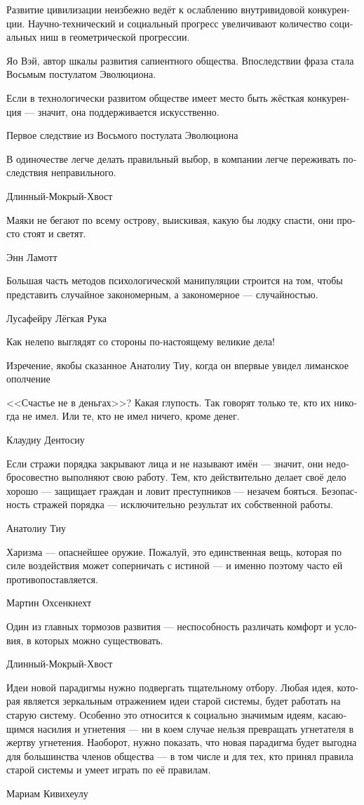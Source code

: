 \documentclass[a4paper,12pt,fleqn]{book}\usepackage{polyglossia}\setdefaultlanguage[babelshorthands=true]{russian}\setotherlanguage{english}\defaultfontfeatures{Ligatures=TeX,Mapping=tex-text}\usepackage{xcolor}\newcommand{\ml}[3]{#2}
\begin{document}
{\epigraph
{Развитие цивилизации неизбежно ведёт к ослаблению внутривидовой конкуренции.
Научно-технический и социальный прогресс увеличивают количество социальных ниш в геометрической прогрессии.}
{Яо Вэй, автор шкалы развития сапиентного общества.
Впоследствии фраза стала Восьмым постулатом Эволюциона.}

\epigraph{Если в технологически развитом обществе имеет место быть жёсткая конкуренция --- значит, она поддерживается искусственно.}
{Первое следствие из Восьмого постулата Эволюциона}

\epigraph
{В одиночестве легче делать правильный выбор, в компании легче переживать последствия неправильного.}
{Длинный-Мокрый-Хвост}

\epigraph
{Маяки не бегают по всему острову, выискивая, какую бы лодку спасти, они просто стоят и светят.}
{Энн Ламотт}

\epigraph{
\ml{$0$}
{Большая часть методов психологической манипуляции строится на том, чтобы представить случайное закономерным, а закономерное --- случайностью.}
{Most of methods of psychological manipulation are based on the idea to make random look logical, and or make logical look random.}
}{Лусафейру Лёгкая Рука}

\epigraph
{Как нелепо выглядят со стороны по-настоящему великие дела!}
{Изречение, якобы сказанное Анатолиу Тиу, когда он впервые увидел лиманское ополчение}

\epigraph
{<<Счастье не в деньгах>>?
Какая глупость.
Так говорят только те, кто их никогда не имел.
Или те, кто не имел ничего, кроме денег.}
{Клаудиу Дентосиу}

\epigraph
{Если стражи порядка закрывают лица и не называют имён --- значит, они недобросовестно выполняют свою работу.
Тем, кто действительно делает своё дело хорошо --- защищает граждан и ловит преступников --- незачем бояться.
Безопасность стражей порядка --- исключительно результат их собственной работы.}
{Анатолиу Тиу}

\epigraph
{Харизма --- опаснейшее оружие.
Пожалуй, это единственная вещь, которая по силе воздействия может соперничать с истиной --- и именно поэтому часто ей противопоставляется.}
{Мартин Охсенкнехт}

\epigraph{
\ml{$0$}
{Один из главных тормозов развития --- неспособность различать комфорт и условия, в которых можно существовать.}
{One of main hindrance to development is inability to distinguish between comfort and possibility to live.}
}{Длинный-Мокрый-Хвост}

\epigraph
{Идеи новой парадигмы нужно подвергать тщательному отбору.
Любая идея, которая является зеркальным отражением идеи старой системы, будет работать на старую систему.
Особенно это относится к социально значимым идеям, касающимся насилия и угнетения --- ни в коем случае нельзя превращать угнетателя в жертву угнетения.
Наоборот, нужно показать, что новая парадигма будет выгодна для большинства членов общества --- в том числе и для тех, кто принял правила старой системы и умеет играть по её правилам.}
{Мариам Кивихеулу}

}
\end{document}
